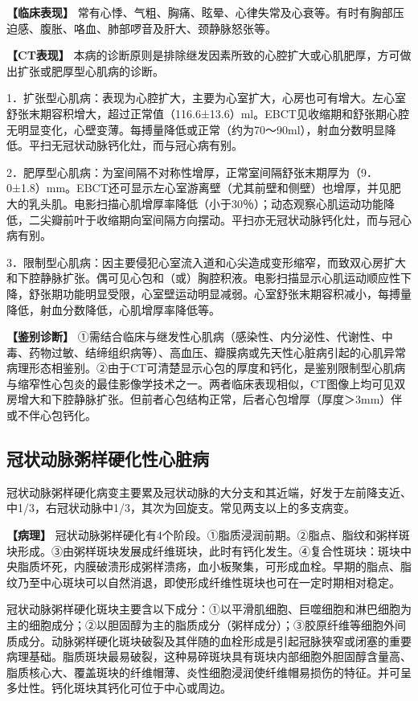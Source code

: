 \textbf{【临床表现】}
常有心悸、气粗、胸痛、眩晕、心律失常及心衰等。有时有胸部压迫感、腹胀、咯血、肺部啰音及肝大、颈静脉怒张等。

\textbf{【CT表现】}
本病的诊断原则是排除继发因素所致的心腔扩大或心肌肥厚，方可做出扩张或肥厚型心肌病的诊断。

1．扩张型心肌病：表现为心腔扩大，主要为心室扩大，心房也可有增大。左心室舒张末期容积增大，超过正常值（116.6±13.6）ml。EBCT见收缩期和舒张期心腔无明显变化，心壁变薄。每搏量降低或正常（约为70～90ml），射血分数明显降低。平扫无冠状动脉钙化灶，而与冠心病有别。

2．肥厚型心肌病：为室间隔不对称性增厚，正常室间隔舒张末期厚为（9．0±1.8）mm。EBCT还可显示左心室游离壁（尤其前壁和侧壁）也增厚，并见肥大的乳头肌。电影扫描心肌增厚率降低（小于30％）；动态观察心肌运动功能降低，二尖瓣前叶于收缩期向室间隔方向摆动。平扫亦无冠状动脉钙化灶，而与冠心病有别。

3．限制型心肌病：因主要侵犯心室流入道和心尖造成变形缩窄，而致双心房扩大和下腔静脉扩张。偶可见心包和（或）胸腔积液。电影扫描显示心肌运动顺应性下降，舒张期功能明显受限，心室壁运动明显减弱。心室舒张末期容积减小，每搏量降低，射血分数降低，心肌增厚率降低等。

\textbf{【鉴别诊断】}
①需结合临床与继发性心肌病（感染性、内分泌性、代谢性、中毒、药物过敏、结缔组织病等）、高血压、瓣膜病或先天性心脏病引起的心肌异常病理形态相鉴别。②由于CT可清楚显示心包的厚度和钙化，是鉴别限制型心肌病与缩窄性心包炎的最佳影像学技术之一。两者临床表现相似，CT图像上均可见双房增大和下腔静脉扩张。但前者心包结构正常，后者心包增厚（厚度＞3mm）伴或不伴心包钙化。

\subsection{冠状动脉粥样硬化性心脏病}

冠状动脉粥样硬化病变主要累及冠状动脉的大分支和其近端，好发于左前降支近、中1/3，右冠状动脉中1/3，其次为回旋支。常见两支以上的多支病变。

\textbf{【病理】}
冠状动脉粥样硬化有4个阶段。①脂质浸润前期。②脂点、脂纹和粥样斑块形成。③由粥样斑块发展成纤维斑块，此时有钙化发生。④复合性斑块：斑块中央脂质坏死，内膜破溃形成粥样溃疡，血小板聚集，可形成血栓。早期的脂点、脂纹乃至中心斑块可以自然消退，即使形成纤维性斑块也可在一定时期相对稳定。

冠状动脉粥样硬化斑块主要含以下成分：①以平滑肌细胞、巨噬细胞和淋巴细胞为主的细胞成分；②以胆固醇为主的脂质成分（粥样成分）；③胶原纤维等细胞外间质成分。动脉粥样硬化斑块破裂及其伴随的血栓形成是引起冠脉狭窄或闭塞的重要病理基础。脂质斑块最易破裂，这种易碎斑块具有斑块内部细胞外胆固醇含量高、脂质核心大、覆盖斑块的纤维帽薄、炎性细胞浸润使纤维帽易损伤的特征。并可呈多灶性。钙化斑块其钙化可位于中心或周边。

